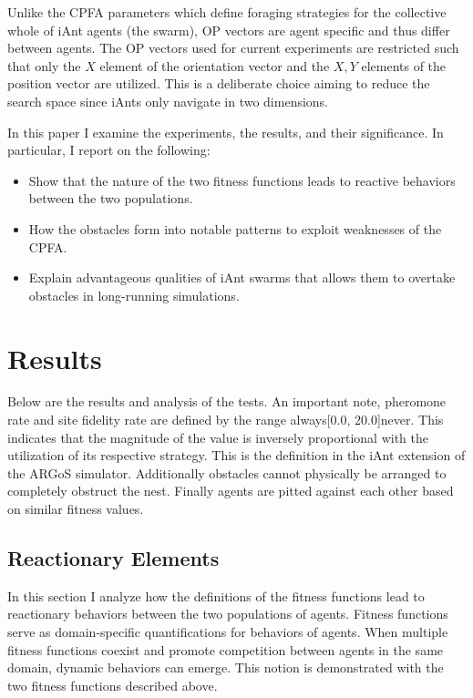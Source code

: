 \documentclass{acm_proc_article-sp}
\begin{document}
Unlike the CPFA parameters which define foraging strategies for the collective whole of iAnt agents (the swarm), OP vectors are agent specific and thus differ between agents. The OP vectors used for current experiments are restricted such that only the $X$ element of the orientation vector and the $X,Y$ elements of the position vector are utilized. This is a deliberate choice aiming to reduce the search space since iAnts only navigate in two dimensions.

In this paper I examine the experiments, the results, and their significance. In particular, I report on the following:

\begin{itemize}
	\item Show that the nature of the two fitness functions leads to reactive behaviors between the two populations.
	\item How the obstacles form into notable patterns to exploit weaknesses of the CPFA.
	\item Explain advantageous qualities of iAnt swarms that allows them to overtake obstacles in long-running simulations.
\end{itemize}



\section{Results}

Below are the results and analysis of the tests. An important note, pheromone rate and site fidelity rate are defined by the range always[0.0, 20.0]never. This indicates that the magnitude of the value is inversely proportional with the utilization of its respective strategy. This is the definition in the iAnt extension of the ARGoS simulator. Additionally obstacles cannot physically be arranged to completely obstruct the nest. Finally agents are pitted against each other based on similar fitness values.



\subsection{Reactionary Elements} \label{sec:part1}

In this section I analyze how the definitions of the fitness functions lead to reactionary behaviors between the two populations of agents. Fitness functions serve as domain-specific quantifications for behaviors of agents. When multiple fitness functions coexist and promote competition between agents in the same domain, dynamic behaviors can emerge. This notion is demonstrated with the two fitness functions described above.
\end{document}

